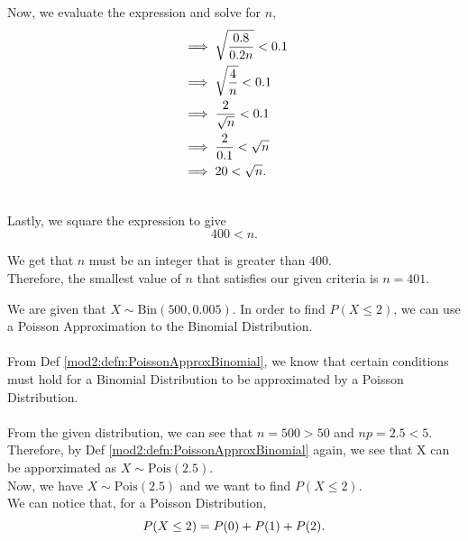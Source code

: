 \begin{subquestions}
\begin{subsubquestions}
Now, we evaluate the expression and solve for $n$,
\begin{align}
		&\implies \sqrt{\frac{0.8}{0.2n}}<0.1 \nonumber \\
		&\implies \sqrt{\frac{4}{n}}<0.1 \nonumber \\
		&\implies \frac{2}{\sqrt{n}}<0.1 \nonumber \\
		&\implies \frac{2}{0.1}<\sqrt{n} \nonumber \\
		&\implies 20<\sqrt{n}.  \\ \nonumber
\end{align}

Lastly, we square the expression to give
\begin{equation}
	400<n.  
\end{equation}

We get that $n$ must be an integer that is greater than $400$. \\
Therefore, the smallest value of $n$ that satisfies our given criteria is $n=401$. \\

\end{subsubquestions}  


\subquestion

We are given that $X \sim \text{Bin} (500,0.005)$. In order to find $P(X\leq2)$, we can use a Poisson Approximation to the Binomial Distribution. \\ \\
From Def \ref{mod2:defn:PoissonApproxBinomial}, we know that certain conditions must hold for a Binomial Distribution to be approximated by a Poisson Distribution. \\ \\
From the given distribution, we can see that $n=500>50$ and $np=2.5<5$. \\

Therefore, by Def \ref{mod2:defn:PoissonApproxBinomial} again, we see that X can be apporximated as $X \sim \text{Pois} (2.5)$.\\

Now, we have $X \sim \text{Pois} (2.5)$ and we want to find $P(X\leq2)$. \\

We can notice that, for a Poisson Distribution, 
\begin{align}
	P(X \leq 2) = P(0) + P(1) + P(2). \\ \nonumber
\end{align}


\end{subquestions}
